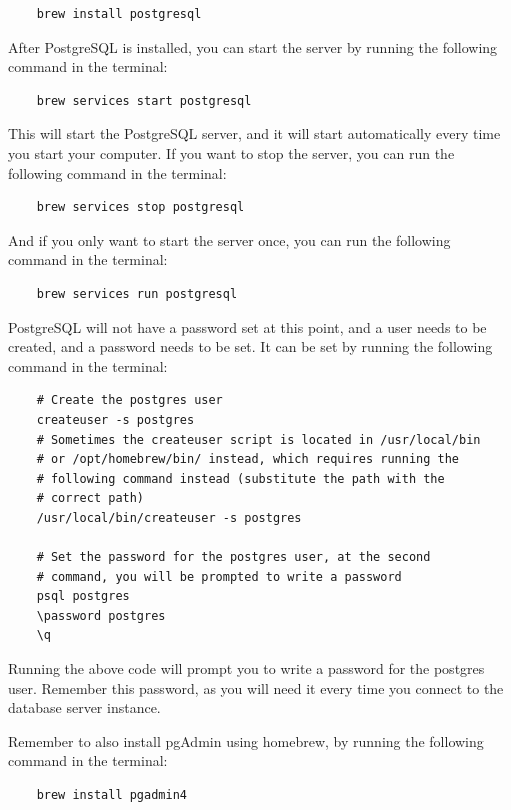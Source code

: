 \begin{verbatim}
    brew install postgresql
\end{verbatim}

After PostgreSQL is installed, you can start the server by running the following command in the terminal:

\begin{verbatim}
    brew services start postgresql
\end{verbatim}

This will start the PostgreSQL server, and it will start automatically every time you start your computer. If you want to stop the server, you can run the following command in the terminal:

\begin{verbatim}
    brew services stop postgresql
\end{verbatim}

And if you only want to start the server once, you can run the following command in the terminal:

\begin{verbatim}
    brew services run postgresql
\end{verbatim}


PostgreSQL will not have a password set at this point, and a user needs to be created, and a password needs to be set. It can be set by running the following command in the terminal:

\begin{verbatim}
    # Create the postgres user
    createuser -s postgres
    # Sometimes the createuser script is located in /usr/local/bin 
    # or /opt/homebrew/bin/ instead, which requires running the 
    # following command instead (substitute the path with the 
    # correct path)
    /usr/local/bin/createuser -s postgres

    # Set the password for the postgres user, at the second
    # command, you will be prompted to write a password
    psql postgres
    \password postgres
    \q
\end{verbatim}

Running the above code will prompt you to write a password for the postgres user. Remember this password, as you will need it every time you connect to the database server instance. 


Remember to also install pgAdmin using homebrew, by running the following command in the terminal:
\begin{verbatim}
    brew install pgadmin4
\end{verbatim}


